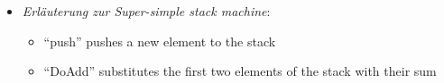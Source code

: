 \begin{itemize}
  \item \textit{Erläuterung zur Super-simple stack machine}:\\
    \begin{itemize}
      \item ``push'' pushes a new element to the stack
      \item ``DoAdd'' substitutes the first two elements of the stack with their sum
    \end{itemize}

        
\end{itemize}









